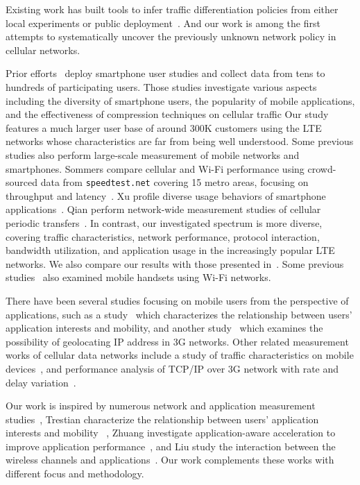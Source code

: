 Existing work has built tools to infer traffic differentiation policies from either local experiments or public deployment~\cite{imc.netpolice, nsdi.glasnost, windrider}. And our work is among the first attempts to systematically uncover the previously unknown network policy in cellular networks.

Prior efforts~\cite{falaki10_mobisys, shepard10, qian13_pam} deploy smartphone user studies and collect data from tens to hundreds of participating users. Those studies investigate various aspects including the diversity of smartphone users, the popularity of mobile applications, and the effectiveness of compression techniques on cellular traffic \etc Our study features a much larger user base of around 300K customers using the LTE networks whose characteristics are far from being well understood. Some previous studies also perform large-scale measurement of mobile networks and smartphones. Sommers \etal compare cellular and Wi-Fi performance using crowd-sourced data from \texttt{speedtest.net} covering 15 metro areas, focusing on throughput and latency~\cite{sommers12}. Xu \etal profile diverse usage behaviors of smartphone applications~\cite{xu11_imc}. Qian \etal perform network-wide measurement studies of cellular periodic transfers~\cite{qian12_www}. In contrast, our investigated spectrum is more diverse, covering traffic characteristics, network performance, protocol interaction, bandwidth utilization, and application usage in the increasingly popular LTE networks. We also compare our results with those presented in~\cite{sommers12}. Some previous studies~\cite{gember11, chen12} also examined mobile handsets using Wi-Fi networks.



There have been several studies focusing on mobile users from the perspective of applications, such as a study~\cite{Ionut:Serendipity:IMC09} which characterizes the relationship between users' application interests and mobility, and another study~\cite{Mahesh:Ephemera:IMC09} which examines the possibility of geolocating IP address in 3G networks. Other related measurement works of cellular data networks include a study of traffic characteristics on mobile devices~\cite{Maier:Traffic:PAM2010}, and performance analysis of TCP/IP over 3G network with rate and delay variation~\cite{Mun:TCP/IP:Mobicom2002}.

Our work is inspired by numerous network and application measurement studies~\cite{Chakravorty:WWAN:Mobicom2004, Zhuang:A3:Mobicom2006, Ionut:Serendipity:IMC09}, \eg Trestian \etal characterize the relationship between users' application interests and mobility ~\cite{Ionut:Serendipity:IMC09}, Zhuang \etal investigate application-aware acceleration to improve application performance~\cite{Zhuang:A3:Mobicom2006}, and Liu \etal study the interaction between the wireless channels and applications~\cite{Liu:3GChannelAppl:Mobicom2008}. Our work complements these works with different focus and methodology. 

